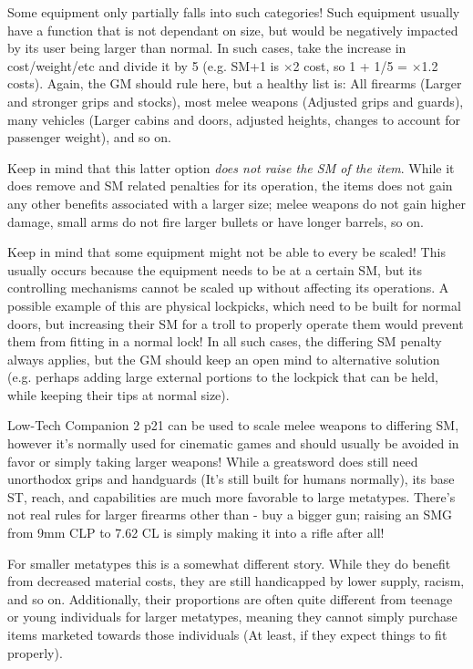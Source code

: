 \begin{multicols*}{3}
	Some equipment only partially falls into such categories! Such equipment usually have a function that is not dependant on size, but would be negatively impacted by its user being larger than normal. In such cases, take the increase in cost/weight/etc and divide it by 5 (e.g. SM+1 is $\times$2 cost, so 1 + 1/5 = $\times$1.2 costs). Again, the GM should rule here, but a healthy list is: All firearms (Larger and stronger grips and stocks), most melee weapons (Adjusted grips and guards), many vehicles (Larger cabins and doors, adjusted heights, changes to account for passenger weight), and so on.
	
	Keep in mind that this latter option \textit{does not raise the SM of the item}. While it does remove and SM related penalties for its operation, the items does not gain any other benefits associated with a larger size; melee weapons do not gain higher damage, small arms do not fire larger bullets or have longer barrels, so on.
	
	Keep in mind that some equipment might not be able to every be scaled! This usually occurs because the equipment needs to be at a certain SM, but its controlling mechanisms cannot be scaled up without affecting its operations. A possible example of this are physical lockpicks, which need to be built for normal doors, but increasing their SM for a troll to properly operate them would prevent them from fitting in a normal lock! In all such cases, the differing SM penalty always applies, but the GM should keep an open mind to alternative solution (e.g. perhaps adding large external portions to the lockpick that can be held, while keeping their tips at normal size).
	
	Low-Tech Companion 2 p21 can be used to scale melee weapons to differing SM, however it's normally used for cinematic games and should usually be avoided in favor or simply taking larger weapons! While a greatsword does still need unorthodox grips and handguards (It's still built for humans normally), its base ST, reach, and capabilities are much more favorable to large metatypes. There's not real rules for larger firearms other than - buy a bigger gun; raising an SMG from 9mm CLP to 7.62 CL is simply making it into a rifle after all!
	
	For smaller metatypes this is a somewhat different story. While they do benefit from decreased material costs, they are still handicapped by lower supply, racism, and so on. Additionally, their proportions are often quite different from teenage or young individuals for larger metatypes, meaning they cannot simply purchase items marketed towards those individuals (At least, if they expect things to fit properly).
	

\end{multicols*}
